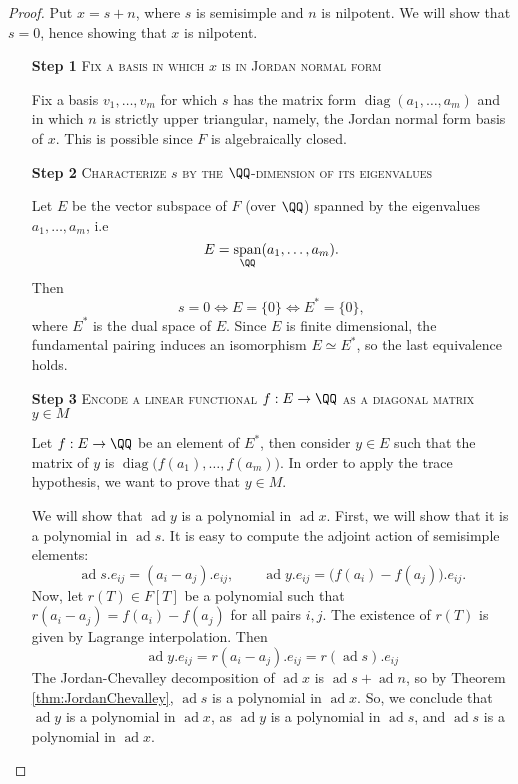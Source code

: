 \documentclass{article}
\DeclareMathOperator{\diag}{diag}
\DeclareMathOperator{\opspan}{span}
\DeclareMathOperator{\ad}{ad}
\newcommand*\acts{.}
\begin{document}
\begin{proof}
    Put $x = s + n$, where $s$ is semisimple and $n$ is nilpotent.
    We will show that $s=0$, hence showing that $x$ is nilpotent.
    \begin{itemize}
        \item[\textbf{Step 1}]
            \textsc{\color{Crimson} Fix a basis in which $x$ is in Jordan normal form}

            Fix a basis $v_1,\ldots,v_m$ for which $s$ has the matrix form $\diag(a_1,\ldots,a_m)$ and in which $n$ is strictly upper triangular, namely, the Jordan normal form basis of $x$.
            This is possible since $F$ is algebraically closed.

        \item[\textbf{Step 2}]
            \textsc{\color{Crimson} Characterize $s$ by the $\QQ$-dimension of its eigenvalues}

            Let $E$ be the vector subspace of $F$ (over $\QQ$) spanned by the eigenvalues $a_1,\ldots,a_m$, i.e
            \[
                E = \opspan_\QQ(a_1,\ldots,a_m).
            \]
            Then
            \[
                s = 0 \iff E = \{0\} \iff E^\ast = \{0\},
            \]
            where $E^\ast$ is the dual space of $E$.
            Since $E$ is finite dimensional, the fundamental pairing induces an isomorphism $E \simeq E^\ast$, so the last equivalence holds.

        \item[\textbf{Step 3}]
            \textsc{\color{Crimson} Encode a linear functional $f: E \to \QQ$ as a diagonal matrix $y \in M$}

            Let $f: E \to \QQ$ be an element of $E^\ast$, then consider $y \in E$ such that the matrix of $y$ is $\diag\big(f(a_1),\ldots,f(a_m)\big)$.
            In order to apply the trace hypothesis, we want to prove that $y \in M$.

            We will show that $\ad y$ is a polynomial in $\ad x$.
            First, we will show that it is a polynomial in $\ad s$.
            It is easy to compute the adjoint action of semisimple elements:
            \[
                \ad s \acts e_{ij}
                =
                (a_i - a_j) \acts e_{ij}, \qquad
                \ad y \acts e_{ij}
                =
                \big(f(a_i) - f(a_j)\big) \acts e_{ij}.
            \]
            Now, let $r(T) \in F[T]$ be a polynomial such that $r(a_i-a_j) = f(a_i)-f(a_j)$ for all pairs $i, j$.
            The existence of $r(T)$ is given by Lagrange interpolation.
            Then
            \[
                \ad y \acts e_{ij}
                =
                r(a_i-a_j) \acts e_{ij}
                =
                r(\ad s) \acts e_{ij}
            \]
            The Jordan-Chevalley decomposition of $\ad x$ is $\ad s + \ad n$, so by Theorem \ref{thm:JordanChevalley}, $\ad s$ is a polynomial in $\ad x$.
            So, we conclude that $\ad y$ is a polynomial in $\ad x$, as $\ad y$ is a polynomial in $\ad s$, and $\ad s$ is a polynomial in $\ad x$.


\end{itemize}
\end{proof}
\end{document}
